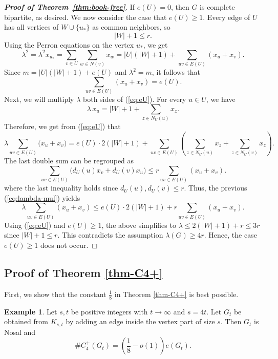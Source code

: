 \documentclass[11pt,a4paper]{article}
\theoremstyle{definition}
\newtheorem{example}[theorem]{Example}
\theoremstyle{plain}
\renewcommand{\le}{\leqslant}
\renewcommand{\ge}{\geqslant}
\begin{document}
\begin{proof}[{\bf Proof of Theorem~\ref{thm:book-free}}]
If $e(U)=0$, then $G$ is complete bipartite, as desired. We now consider the case that $e(U)\ge 1$.  Every edge of $U$ has all vertices of $W\cup\{u_*\}$ as common neighbors, so
\[
|W| +1 \le r.
\]  
Using the Perron equations on the vertex $u_*$, we get
\[ \lambda^2= 
\lambda^2 x_{u_*}=\sum_{v\in U} \sum_{w\in N(v)} x_w 
=|U| (|W| +1)+ \sum_{uv\in E(U)} (x_u+x_v).
\]
Since $m=|U| (|W| +1)+ e(U)$ and 
 $\lambda^2=m$, it follows that
\begin{equation} \label{eq:eU}
\sum_{uv\in E(U)} (x_u+x_v)=e(U).
\end{equation}
Next, we will multiply $\lambda$ both sides of (\ref{eq:eU}). 
For every $u\in U$, we have
\[
\lambda \, x_u=|W| +1 +\sum_{z\in N_U(u)}x_z.
\]
Therefore, we get from (\ref{eq:eU}) that 
\begin{equation} \label{eq:lambda-mul} 
 \lambda \sum_{uv\in E(U)}\bigl( x_u+ x_v\bigr) 
=
e(U) \cdot 2(|W| +1)+
\sum_{uv\in E(U)}\left(\sum_{z\in N_U(u)}x_z+
\sum_{z\in N_U(v)}x_z\right).
\end{equation}
The last double sum can be regrouped as
\[
\sum_{uv\in E(U)}\bigl(d_U(u)x_v+d_U(v)x_u\bigr) \le r\sum_{uv\in E(U)}(x_u+x_v).
\]
where the last inequality holds since $d_U(u), d_U(v)\le r$. 
Thus, the previous (\ref{eq:lambda-mul}) yields 
\[
\lambda \sum_{uv\in E(U)}(x_u+x_v) \le e(U)\cdot 2(|W| +1)+r \sum_{uv\in E(U)}(x_u+x_v).
\]
Using (\ref{eq:eU}) and $e(U)\ge 1$, the above   simplifies to 
$\lambda \le 2(|W| +1) +r \le 3r$ since $|W|+1\le r$. 
This contradicts the assumption $\lambda(G)\ge 4r$. Hence, the case $e(U)\ge 1$ does not occur. 
\end{proof}


\subsection{Proof of Theorem \ref{thm-C4+}}

\label{sec:kites}

First, we show that the constant $\frac{1}{8}$ in Theorem \ref{thm-C4+} is best possible.

\begin{example} \label{exam-sharp-constant}
Let $s,t$ be positive integers with $t\to \infty$ and $s=4t$.
Let $G_t$ be obtained from $K_{s,t}$ by adding an edge inside   
the vertex part of size $s$. Then 
$G_t$ is Nosal and 
$$\texttt{\#}  C_4^+(G_t)= 
\left(\frac{1}{8}- o(1) \right)e(G_t). $$
\end{example} 
\end{document}
